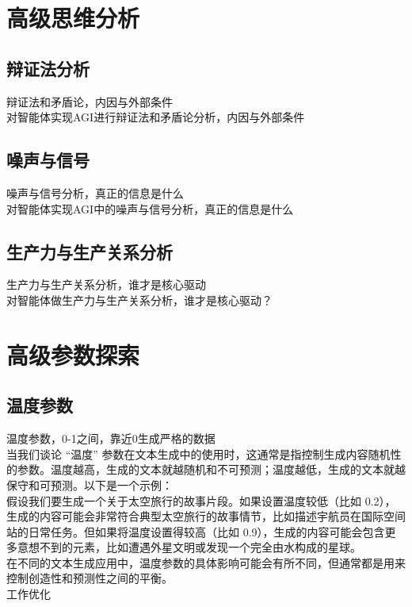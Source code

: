 \documentclass[12pt]{book}
\begin{document}
\chapter{高级思维分析}
\section{辩证法分析}
辩证法和矛盾论，内因与外部条件\\

对智能体实现AGI进行辩证法和矛盾论分析，内因与外部条件

\section{噪声与信号}
噪声与信号分析，真正的信息是什么\\

对智能体实现AGI中的噪声与信号分析，真正的信息是什么

\section{生产力与生产关系分析}
生产力与生产关系分析，谁才是核心驱动\\

对智能体做生产力与生产关系分析，谁才是核心驱动？

\chapter{高级参数探索}
\section{温度参数}
温度参数，0-1之间，靠近0生成严格的数据\\
当我们谈论 “温度” 参数在文本生成中的使用时，这通常是指控制生成内容随机性的参数。温度越高，生成的文本就越随机和不可预测；温度越低，生成的文本就越保守和可预测。以下是一个示例：\\
假设我们要生成一个关于太空旅行的故事片段。如果设置温度较低（比如 0.2），生成的内容可能会非常符合典型太空旅行的故事情节，比如描述宇航员在国际空间站的日常任务。但如果将温度设置得较高（比如 0.9），生成的内容可能会包含更多意想不到的元素，比如遭遇外星文明或发现一个完全由水构成的星球。\\
在不同的文本生成应用中，温度参数的具体影响可能会有所不同，但通常都是用来控制创造性和预测性之间的平衡。\\

\bigskip
工作优化
\end{document}
